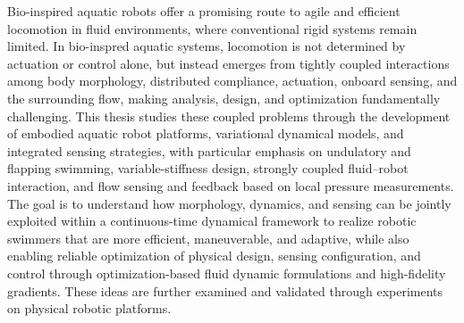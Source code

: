 
\setlength{\parskip}{1em}
\setlength{\parindent}{0em}

\noindent
Bio-inspired aquatic robots offer a promising route to agile and efficient locomotion in fluid environments, where conventional rigid systems remain limited. In bio-inspred aquatic systems, locomotion is not determined by actuation or control alone, but instead emerges from tightly coupled interactions among body morphology, distributed compliance, actuation, onboard sensing, and the surrounding flow, making analysis, design, and optimization fundamentally challenging. This thesis studies these coupled problems through the development of embodied aquatic robot platforms, variational dynamical models, and integrated sensing strategies, with particular emphasis on undulatory and flapping swimming, variable-stiffness design, strongly coupled fluid–robot interaction, and flow sensing and feedback based on local pressure measurements. The goal is to understand how morphology, dynamics, and sensing can be jointly exploited within a continuous-time dynamical framework to realize robotic swimmers that are more efficient, maneuverable, and adaptive, while also enabling reliable optimization of physical design, sensing configuration, and control through optimization-based fluid dynamic formulations and high-fidelity gradients. These ideas are further examined and validated through experiments on physical robotic platforms.